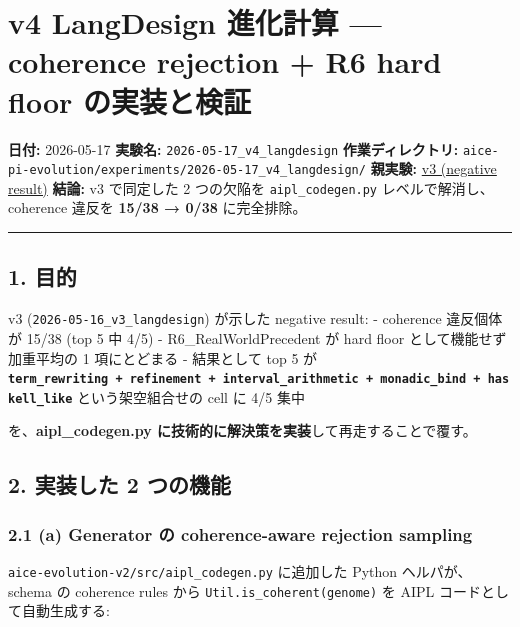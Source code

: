 \documentclass[
]{ltjsarticle}
\author{}
\date{}
\begin{document}
{
\setcounter{tocdepth}{2}
\tableofcontents
}
\section{v4 LangDesign 進化計算 --- coherence rejection + R6 hard floor
の実装と検証}\label{v4-langdesign-ux9032ux5316ux8a08ux7b97-coherence-rejection-r6-hard-floor-ux306eux5b9fux88c5ux3068ux691cux8a3c}

\textbf{日付:} 2026-05-17 \textbf{実験名:}
\texttt{2026-05-17\_v4\_langdesign} \textbf{作業ディレクトリ:}
\texttt{aice-pi-evolution/experiments/2026-05-17\_v4\_langdesign/}
\textbf{親実験:} \href{../2026-05-16_v3_langdesign/REPORT.md}{v3
(negative result)} \textbf{結論:} v3 で同定した 2 つの欠陥を
\texttt{aipl\_codegen.py} レベルで解消し、coherence 違反を \textbf{15/38
→ 0/38} に完全排除。

\begin{center}\rule{0.5\linewidth}{0.5pt}\end{center}

\subsection{1. 目的}\label{ux76eeux7684}

v3 (\texttt{2026-05-16\_v3\_langdesign}) が示した negative result: -
coherence 違反個体が 15/38 (top 5 中 4/5) - R6\_RealWorldPrecedent が
hard floor として機能せず加重平均の 1 項にとどまる - 結果として top 5 が
\textbf{\texttt{term\_rewriting\ +\ refinement\ +\ interval\_arithmetic\ +\ monadic\_bind\ +\ haskell\_like}}
という架空組合せの cell に 4/5 集中

を、\textbf{aipl\_codegen.py
に技術的に解決策を実装}して再走することで覆す。

\subsection{2. 実装した 2
つの機能}\label{ux5b9fux88c5ux3057ux305f-2-ux3064ux306eux6a5fux80fd}

\subsubsection{2.1 (a) Generator の coherence-aware rejection
sampling}\label{a-generator-ux306e-coherence-aware-rejection-sampling}

\texttt{aice-evolution-v2/src/aipl\_codegen.py} に追加した Python
ヘルパが、schema の coherence rules から
\texttt{Util.is\_coherent(genome)} を AIPL コードとして自動生成する:
\end{document}
